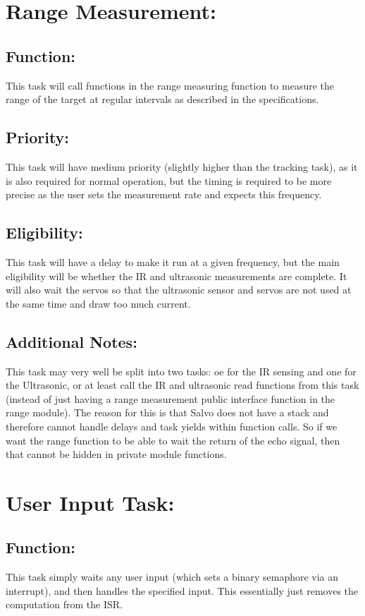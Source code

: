 \documentclass[]{article}
\begin{document}
\section{Range Measurement:}

\subsection{Function:}
This task will call functions in the range measuring function to measure the range of the target at regular intervals as described in the specifications.

\subsection{Priority:}
This task will have medium priority (slightly higher than the tracking task), as it is also required for normal operation, but the timing is required to be more precise as the user sets the measurement rate and expects this frequency.

\subsection{Eligibility:}
This task will have a delay to make it run at a given frequency, but the main eligibility will be whether the IR and ultrasonic measurements are complete. It will also wait the servos so that the ultrasonic sensor and servos are not used at the same time and draw too much current.

\subsection{Additional Notes:}
This task may very well be split into two tasks: oe for the IR sensing and one for the Ultrasonic, or at least call the IR and ultrasonic read functions from this task (instead of just having a range measurement public interface function in the range module). The reason for this is that Salvo does not have a stack and therefore cannot handle delays and task yields within function calls. So if we want the range function to be able to wait the return of the echo signal, then that cannot be hidden in private module functions.

\section{User Input Task:}

\subsection{Function:}
This task simply waits any user input (which sets a binary semaphore via an interrupt), and then handles the specified input. This essentially just removes the computation from the ISR.
\end{document}
